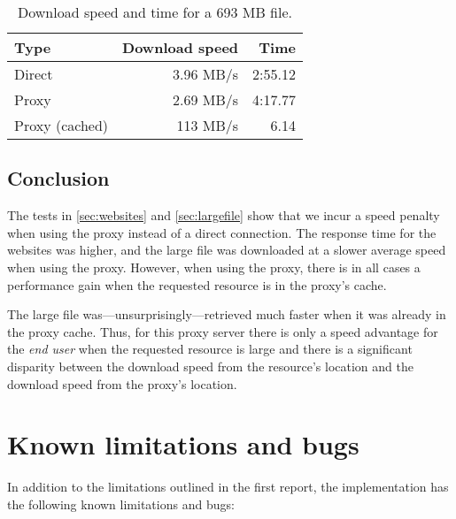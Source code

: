 \documentclass{sig-alternate}
\begin{document}
\begin{table}[h]
    \centering
    \begin{tabular}{|l||r|r|}
        \hline
        \bf{Type} & \bf{Download speed} & \bf{Time} \\
        \hline
        \hline
        Direct & 3.96 MB/s & 2:55.12 \\ \hline
        Proxy & 2.69 MB/s & 4:17.77 \\ \hline
        Proxy (cached) & 113 MB/s & 6.14 \\ \hline
    \end{tabular}
    \caption{Download speed and time for a 693 MB file.}
    \label{tbl:largefile}
\end{table}

\subsection{Conclusion}
\label{sec:testconclusions}

The tests in \autoref{sec:websites} and \autoref{sec:largefile} show that we
incur a speed penalty when using the proxy instead of a direct connection. The
response time for the websites was higher, and the large file was downloaded
at a slower average speed when using the proxy. However, when using the proxy,
there is in all cases a performance gain when the requested resource is in the
proxy's cache.

The large file was---unsurprisingly---retrieved much faster when it was
already in the proxy cache. Thus, for this proxy server there is only a
speed advantage for the \emph{end user} when the requested resource is large
and there is a significant disparity between the download speed from the
resource's location and the download speed from the proxy's location.


\section{Known limitations and bugs}
\label{sec:bugs}

In addition to the limitations outlined in the first report, the
implementation has the following known limitations and bugs:
\end{document}
